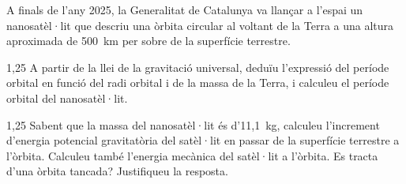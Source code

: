 A finals de l'any 2025, la Generalitat de Catalunya va llançar a l'espai un nanosatèl·lit que descriu una òrbita circular al voltant de la Terra a una altura aproximada de 500~km per sobre de la superfície terrestre.

\begin{apartat}{1,25}
A partir de la llei de la gravitació universal, deduïu l'expressió del període orbital en funció del radi orbital i de la massa de la Terra, i calculeu el període orbital del nanosatèl·lit.
\end{apartat}

\begin{apartat}{1,25}
Sabent que la massa del nanosatèl·lit és d'11,1~kg, calculeu l'increment d'energia potencial gravitatòria del satèl·lit en passar de la superfície terrestre a l'òrbita. Calculeu també l'energia mecànica del satèl·lit a l'òrbita. Es tracta d'una òrbita tancada? Justifiqueu la resposta.
\end{apartat}

